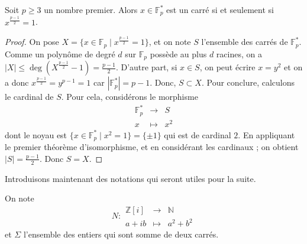 






	\begin{lemma}
		\label{theoreme-des-deux-carres-fermat-1}
		Soit $p \geq 3$ un nombre premier. Alors $x \in \mathbb{F}^*_p$ est un carré si et seulement si $x^{\frac{p-1}{2}} = 1$.
	\end{lemma}

	\begin{proof}
		On pose $X = \{ x \in \mathbb{F}_p \mid x^{\frac{p-1}{2}} = 1 \}$, et on note $S$ l'ensemble des carrés de $\mathbb{F}_p^*$. Comme un polynôme de degré $d$ sur $\mathbb{F}_p$ possède au plus $d$ racines, on a $|X| \leq \deg \left( X^{\frac{p-1}{2}} - 1 \right) = \frac{p-1}{2}$.
		\newpar
		D'autre part, si $x \in S$, on peut écrire $x = y^2$ et on a donc $x^{\frac{p-1}{2}} = y^{p-1} = 1$ car $|\mathbb{F}_p^*| = p-1$. Donc, $S \subset X$.
		\newpar
		Pour conclure, calculons le cardinal de $S$. Pour cela, considérons le morphisme
		\[
		\begin{array}{ccc}
			\mathbb{F}_p^* &\rightarrow& S \\
			x &\mapsto& x^2
		\end{array}
		\]
		dont le noyau est $\{ x \in \mathbb{F}_p^* \mid x^2 = 1 \} = \{ \pm 1 \}$ qui est de cardinal $2$. En appliquant le premier théorème d'isomorphisme, et en considérant les cardinaux ; on obtient $|S| = \frac{p-1}{2}$. Donc $S = X$.
	\end{proof}

	Introduisons maintenant des notations qui seront utiles pour la suite.

	\begin{notation}
		On note \[ N :
		\begin{array}{ccc}
			\mathbb{Z}[i] &\rightarrow& \mathbb{N} \\
			a+ib &\mapsto& a^2 + b^2
		\end{array}
		\] et $\Sigma$ l'ensemble des entiers qui sont somme de deux carrés.
	\end{notation}

